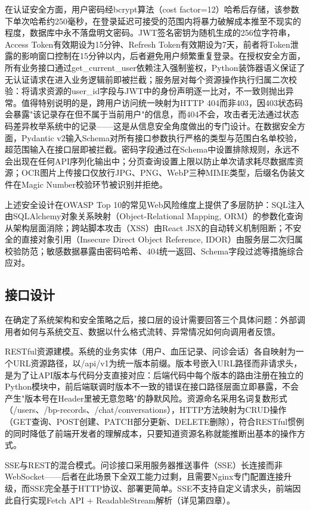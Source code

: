 \documentclass[zihao=-4,a4paper]{ctexart}
\numberwithin{figure}{section}
\numberwithin{table}{section}
\begin{document}
在认证安全方面，用户密码经bcrypt算法（cost factor=12）哈希后存储，该参数下单次哈希约250毫秒，在登录延迟可接受的范围内将暴力破解成本推至不现实的程度，数据库中永不落盘明文密码。JWT签名密钥为随机生成的256位字符串，Access Token有效期设为15分钟、Refresh Token有效期设为7天，前者将Token泄露的影响窗口控制在15分钟以内，后者避免用户频繁重复登录。在授权安全方面，所有业务接口通过get\_current\_user依赖注入强制鉴权，Python装饰器语义保证了无认证请求在进入业务逻辑前即被拦截；服务层对每个资源操作执行归属二次校验：将请求资源的user\_id字段与JWT中的身份声明逐一比对，不一致则抛出异常。值得特别说明的是，跨用户访问统一映射为HTTP 404而非403，因403状态码会暴露"该记录存在但不属于当前用户"的信息，而404不会，攻击者无法通过状态码差异枚举系统中的记录——这是从信息安全角度做出的专门设计。在数据安全方面，Pydantic v2输入Schema对所有接口参数执行严格的类型与范围白名单校验，超范围输入在接口层即被拦截。密码字段通过在Schema中设置排除规则，永远不会出现在任何API序列化输出中；分页查询设置上限以防止单次请求耗尽数据库资源；OCR图片上传接口仅放行JPG、PNG、WebP三种MIME类型，后缀名伪装文件在Magic Number校验环节被识别并拒绝。

上述安全设计在OWASP Top 10的常见Web风险维度上提供了多层防护：SQL注入由SQLAlchemy对象关系映射（Object-Relational Mapping, ORM）的参数化查询从架构层面消除；跨站脚本攻击（XSS）由React JSX的自动转义机制阻断；不安全的直接对象引用（Insecure Direct Object Reference, IDOR）由服务层二次归属校验防范；敏感数据暴露由密码哈希、404统一返回、Schema字段过滤等措施综合应对。

\subsection{接口设计}

在确定了系统架构和安全策略之后，接口层的设计需要回答三个具体问题：外部调用者如何与系统交互、数据以什么格式流转、异常情况如何向调用者反馈。

RESTful资源建模。系统的业务实体（用户、血压记录、问诊会话）各自映射为一个URL资源路径，以/api/v1为统一版本前缀。版本号嵌入URL路径而非请求头，是为了让API版本与代码分支直接对应：后端代码中每个版本的路由注册在独立的Python模块中，前后端联调时版本不一致的错误在接口路径层面立即暴露，不会产生"版本号在Header里被无意忽略"的静默风险。资源命名采用名词复数形式（/users、/bp-records、/chat/conversations），HTTP方法映射为CRUD操作（GET查询、POST创建、PATCH部分更新、DELETE删除），符合RESTful惯例的同时降低了前端开发者的理解成本，只要知道资源名称就能推断出基本的操作方式。

SSE与REST的混合模式。问诊接口采用服务器推送事件（SSE）长连接而非WebSocket——后者在此场景下全双工能力过剩，且需要Nginx专门配置连接升级，而SSE完全基于HTTP协议、部署更简单。SSE不支持自定义请求头，前端因此自行实现Fetch API + ReadableStream解析（详见第四章）。
\end{document}
